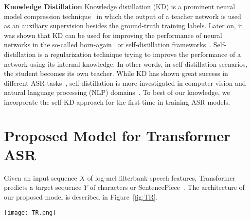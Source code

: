 \documentclass{article}
\begin{document}
\textbf{Knowledge Distillation} 
Knowledge distillation (KD) is a prominent neural model compression technique~\citep{hinton2015distilling} in which the output of a teacher network is used as an auxiliary supervision besides the ground-truth training labels. Later on, it was shown that KD can be used for improving the performance of neural networks in the so-called born-again~\citep{furlanello2018born} or self-distillation frameworks~\citep{selfkdgeneralization,yun2020regularizing,hahn2019self}. Self-distillation is a regularization technique trying to improve the performance of a network using its internal knowledge. In other words, in self-distillation scenarios, the student becomes its own teacher. 
While KD has shown great success in different ASR tasks~\citep{kdasra,kdasrb,kdasrc,kdasrd,kdasre,kdasrf,kdasrg}, self-distillation is more investigated in computer vision and natural language processing (NLP) domains~\citep{selfkdnlp,hahn2019self}. 
To best of our knowledge, we incorporate the self-KD approach for the first time in training ASR models. 



\section{Proposed Model for Transformer ASR}
Given an input sequence $X$ of log-mel filterbank speech features, Transformer predicts a target sequence $Y$ of characters or SentencePiece~\citep{kudo2018sentencepiece}. The architecture of our proposed model is described in Figure~\ref{fig:TR}.

\begin{figure*}[ht]
\vskip 0.2in
\begin{center}
\centerline{\texttt{[image: TR.png]}}
\caption{Proposed Transformer ASR with time-reduction layer}
\label{fig:TR}
\end{center}
\vskip -0.2in
\end{figure*}
\end{document}
